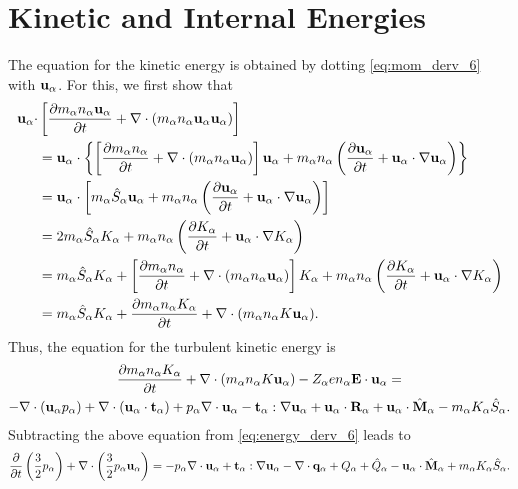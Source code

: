 \documentclass[a4paper,11pt]{report}
\begin{document}
\section{Kinetic and Internal Energies}
The equation for the kinetic energy is obtained by dotting \cref{eq:mom_derv_6} with $\mathbf{u}_\alpha$. For this, we first show that
\begin{align}
    \mathbf{u}_\alpha \cdot &\left [ \frac{\partial m_\alpha n_\alpha \mathbf{u}_\alpha}{\partial t} + \nabla \cdot \left ( m_\alpha n_\alpha \mathbf{u}_\alpha \mathbf{u}_\alpha \right) \right ] \\
    & =\mathbf{u}_\alpha \cdot \left \{ \left [ \frac{\partial m_\alpha n_\alpha }{\partial t} + \nabla \cdot \left ( m_\alpha n_\alpha \mathbf{u}_\alpha \right) \right] \mathbf{u}_\alpha  + m_\alpha n_\alpha \left ( \frac{\partial \mathbf{u}_\alpha}{\partial t} + \mathbf{u}_\alpha \cdot \nabla \mathbf{u}_\alpha \right ) \right \}\\
    & =\mathbf{u}_\alpha \cdot \left [ m_\alpha \hat{S}_\alpha \mathbf{u}_\alpha  + m_\alpha n_\alpha \left ( \frac{\partial \mathbf{u}_\alpha}{\partial t} + \mathbf{u}_\alpha \cdot \nabla \mathbf{u}_\alpha \right ) \right ] \\
    & =2m_\alpha \hat{S}_\alpha K_\alpha + m_\alpha n_\alpha \left ( \frac{\partial K_\alpha}{\partial t} + \mathbf{u}_\alpha \cdot \nabla K_\alpha \right) \\
    & =m_\alpha \hat{S}_\alpha K_\alpha + \left [ \frac{\partial m_\alpha n_\alpha}{\partial t} + \nabla \cdot \left (m_\alpha n_\alpha \mathbf{u}_\alpha \right ) \right] K_\alpha + m_\alpha n_\alpha \left ( \frac{\partial K_\alpha}{\partial t} + \mathbf{u}_\alpha \cdot \nabla K_\alpha \right) \\
    & =m_\alpha \hat{S}_\alpha K_\alpha + \frac{\partial m_\alpha n_\alpha K_\alpha}{\partial t} + \nabla \cdot ( m_\alpha n_\alpha K \mathbf{u}_\alpha ).
\end{align}
Thus, the equation for the turbulent kinetic energy is
\begin{multline}
\frac{\partial m_\alpha n_\alpha K_\alpha}{\partial t} + \nabla \cdot ( m_\alpha n_\alpha K \mathbf{u}_\alpha ) - Z_\alpha e n_\alpha \mathbf{E} \cdot \mathbf{u}_\alpha =\\
-\nabla \cdot ( \mathbf{u}_\alpha p_\alpha ) + \nabla \cdot (\mathbf{u}_\alpha \cdot \mathbf{t}_\alpha ) + p_\alpha \nabla \cdot \mathbf{u}_\alpha - \mathbf{t}_\alpha : \nabla \mathbf{u}_\alpha + \mathbf{u}_\alpha \cdot \mathbf{R}_\alpha + \mathbf{u}_\alpha \cdot \hat{\mathbf{M}}_\alpha - m_\alpha K_\alpha \hat{S}_\alpha .
\end{multline}
Subtracting the above equation from \cref{eq:energy_derv_6} leads to 
\begin{equation}
\frac{\partial}{\partial t} \left ( \frac{3}{2} p_\alpha \right ) + \nabla \cdot \left ( \frac{3}{2} p_\alpha \mathbf{u}_\alpha \right ) = -p_\alpha \nabla \cdot \mathbf{u}_\alpha + \mathbf{t}_\alpha : \nabla \mathbf{u}_\alpha - \nabla \cdot \mathbf{q}_\alpha + Q_{\alpha} + \hat{Q}_\alpha - \mathbf{u}_\alpha \cdot \hat{\mathbf{M}}_\alpha + m_\alpha K_\alpha \hat{S}_\alpha .
\end{equation}
\end{document}
